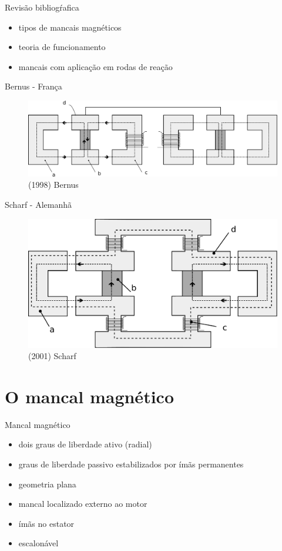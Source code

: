 \documentclass{beamer}
\begin{document}
\begin{frame}{Revisão bibliogŕafica}
	\begin{itemize}
		\item tipos de mancais magnéticos
		\item teoria de funcionamento
		\item mancais com aplicação em rodas de reação
	\end{itemize}	
\end{frame}

\begin{frame}{Bernus - França}
	\begin{figure}
		\centering
		\includegraphics[width=1\linewidth]{../../Dissertacao/Figs/mancais/frances}
		{\caption*{(1998) Bernus}}
	\end{figure}
\end{frame}	

\begin{frame}{Scharf - Alemanhã}
	\begin{figure}
		\centering
	\includegraphics[width=0.7\linewidth]{../../Dissertacao/Figs/mancais/alemao.pdf}
		{\caption*{(2001) Scharf}}
	\end{figure}
\end{frame}	


\section{O mancal magnético}

\begin{frame}{Mancal magnético}
	\begin{itemize}
		\item dois graus de liberdade ativo (radial)
		\item graus de liberdade passivo estabilizados por ímãs permanentes
		\item geometria plana
		\item mancal localizado externo ao motor
		\item ímãs no estator
		\item escalonável 
	\end{itemize}	
\end{frame}
\end{document}
